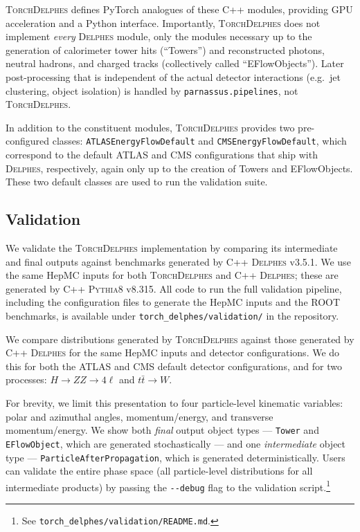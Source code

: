 \documentclass[11pt,a4paper]{article}          %
\begin{document}
\textsc{TorchDelphes} defines PyTorch analogues of these C++ modules, providing
GPU acceleration and a Python interface. Importantly, \textsc{TorchDelphes}
does not implement \textit{every} \textsc{Delphes} module, only the modules
necessary up to the generation of calorimeter tower hits (``Towers'') and
reconstructed photons, neutral hadrons, and charged tracks (collectively called
``EFlowObjects''). Later post-processing that is independent of the actual
detector interactions (e.g.\ jet clustering, object isolation) is handled by
\texttt{parnassus.pipelines}, not \textsc{TorchDelphes}.

In addition to the constituent modules, \textsc{TorchDelphes} provides two
pre-configured classes: \texttt{ATLASEnergyFlowDefault} and
\texttt{CMSEnergyFlowDefault}, which correspond to the default ATLAS and CMS
configurations that ship with \textsc{Delphes}, respectively, again only up to
the creation of Towers and EFlowObjects. These two default classes are used to
run the validation suite.

\subsection{Validation}

We validate the \textsc{TorchDelphes} implementation by comparing its
intermediate and final outputs against benchmarks generated by C++
\textsc{Delphes} v3.5.1. We use the same HepMC inputs for both
\textsc{TorchDelphes} and C++ \textsc{Delphes}; these are generated by C++
\textsc{Pythia8} v8.315. All code to run the full validation pipeline,
including the configuration files to generate the HepMC inputs and the ROOT
benchmarks, is available under \texttt{torch\_delphes/validation/} in the
repository.

We compare distributions generated by \textsc{TorchDelphes} against those
generated by C++ \textsc{Delphes} for the same HepMC inputs and detector
configurations. We do this for both the ATLAS and CMS default detector
configurations, and for two processes: $H \to ZZ \to 4\ell$ and
$t\bar{t} \to W$.

For brevity, we limit this presentation to four particle-level kinematic
variables: polar and azimuthal angles, momentum/energy, and transverse
momentum/energy. We show both \textit{final} output object types ---
\texttt{Tower} and \texttt{EFlowObject}, which are generated stochastically
--- and one \textit{intermediate} object type ---
\texttt{ParticleAfterPropagation}, which is generated deterministically.
Users can validate the entire phase space (all particle-level distributions for
all intermediate products) by passing the \texttt{-{}-debug} flag to the
validation script.\footnote{See \texttt{torch\_delphes/validation/README.md}.}
\end{document}
